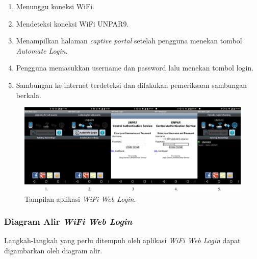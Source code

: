 \begin{enumerate}
    \item{Menunggu koneksi WiFi.}
    \item{Mendeteksi koneksi WiFi UNPAR9.}
    \item{Menampilkan halaman \textit{captive portal} setelah pengguna menekan tombol \textit{Automate Login}.}
    \item{Pengguna memasukkan username dan password lalu menekan tombol login.}
    \item{Sambungan ke internet terdeteksi dan dilakukan pemeriksaan sambungan berkala.}
\end{enumerate}

\begin{figure}[h]
    \centering
    \includegraphics[scale=0.085]{Gambar/screenshot_wifiweblogin.png}
    \caption[Tampilan aplikasi \textit{WiFi Web Login}.]{Tampilan aplikasi \textit{WiFi Web Login}.} 
    \label{fig:screenshot_wifiweblogin}
\end{figure}

\subsubsection{Diagram Alir \textit{WiFi Web Login}}
\label{subsubsec:diagram_alir_wifi_web_login}

Langkah-langkah yang perlu ditempuh oleh aplikasi \textit{WiFi Web Login} dapat digambarkan oleh diagram alir.

